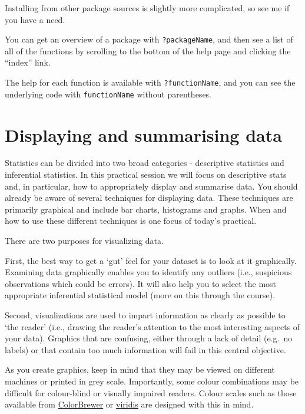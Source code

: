\documentclass[
  11pt,
  a4paper,
]{book}
\begin{document}
Installing from other package sources is slightly more complicated, so see me if you have a need.

You can get an overview of a package with \texttt{?packageName}, and then see a list of all of the functions by scrolling to the bottom of the help page and clicking the ``index'' link.

The help for each function is available with \texttt{?functionName}, and you can see the underlying code with \texttt{functionName} without parentheses.

\hypertarget{EDA}{%
\chapter{Displaying and summarising data}\label{EDA}}

Statistics can be divided into two broad categories - descriptive statistics and inferential statistics. In this practical session we will focus on descriptive stats and, in particular, how to appropriately display and summarise data. You should already be aware of several techniques for displaying data. These techniques are primarily graphical and include bar charts, histograms and graphs. When and how to use these different techniques is one focus of today's practical.

There are two purposes for visualizing data.

First, the best way to get a `gut' feel for your dataset is to look at it graphically. Examining data graphically enables you to identify any outliers (i.e., suspicious observations which could be errors). It will also help you to select the most appropriate inferential statistical model (more on this through the course).

Second, visualizations are used to impart information as clearly as possible to `the reader' (i.e., drawing the reader's attention to the most interesting aspects of your data). Graphics that are confusing, either through a lack of detail (e.g.~no labels) or that contain too much information will fail in this central objective.

As you create graphics, keep in mind that they may be viewed on different machines or printed in grey scale. Importantly, some colour combinations may be difficult for colour-blind or visually impaired readers. Colour scales such as those available from \href{https://colorbrewer2.org}{ColorBrewer} or \href{https://cran.r-project.org/web/packages/viridis/vignettes/intro-to-viridis.html}{viridis} are designed with this in mind.
\end{document}
